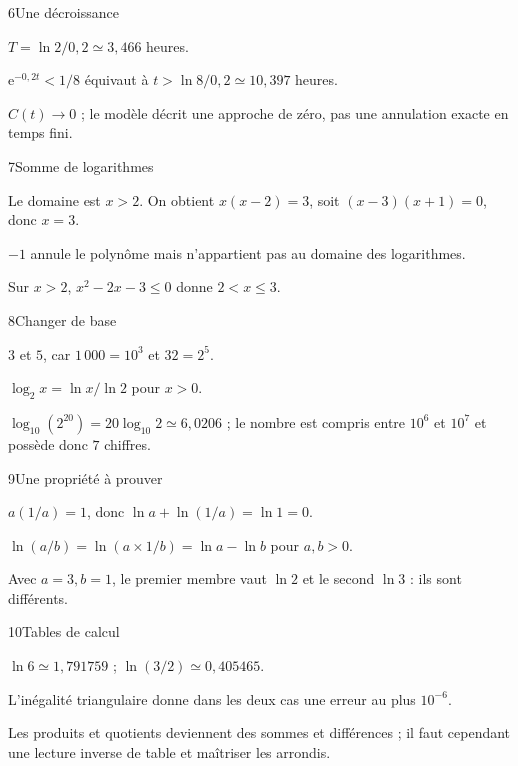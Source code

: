 \begin{corrige}{6}{Une décroissance}
\begin{questions}
\item $T=\ln2/0{,}2\simeq3{,}466$ heures.
\item $\mathrm e^{-0{,}2t}<1/8$ équivaut à $t>\ln8/0{,}2\simeq10{,}397$ heures.
\item $C(t)\to0$ ; le modèle décrit une approche de zéro, pas une annulation exacte en temps fini.
\end{questions}
\end{corrige}
\begin{corrige}{7}{Somme de logarithmes}
\begin{questions}
\item Le domaine est $x>2$. On obtient $x(x-2)=3$, soit $(x-3)(x+1)=0$, donc $x=3$.
\item $-1$ annule le polynôme mais n’appartient pas au domaine des logarithmes.
\item Sur $x>2$, $x^2-2x-3\leq0$ donne $2<x\leq3$.
\end{questions}
\end{corrige}
\begin{corrige}{8}{Changer de base}
\begin{questions}
\item $3$ et $5$, car $1\,000=10^3$ et $32=2^5$.
\item $\log_2 x=\ln x/\ln2$ pour $x>0$.
\item $\log_{10}(2^{20})=20\log_{10}2\simeq6{,}0206$ ; le nombre est compris entre $10^6$ et $10^7$ et possède donc $7$ chiffres.
\end{questions}
\end{corrige}
\begin{corrige}{9}{Une propriété à prouver}
\begin{questions}
\item $a(1/a)=1$, donc $\ln a+\ln(1/a)=\ln1=0$.
\item $\ln(a/b)=\ln(a\times1/b)=\ln a-\ln b$ pour $a,b>0$.
\item Avec $a=3,b=1$, le premier membre vaut $\ln2$ et le second $\ln3$ : ils sont différents.
\end{questions}
\end{corrige}
\begin{corrige}{10}{Tables de calcul}
\begin{questions}
\item $\ln6\simeq1{,}791759$ ; $\ln(3/2)\simeq0{,}405465$.
\item L’inégalité triangulaire donne dans les deux cas une erreur au plus $10^{-6}$.
\item Les produits et quotients deviennent des sommes et différences ; il faut cependant une lecture inverse de table et maîtriser les arrondis.
\end{questions}
\end{corrige}
